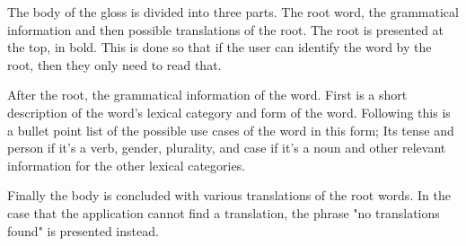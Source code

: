 The body of the gloss is divided into three parts. The root word, the grammatical information and then possible translations of the root. The root is presented at the top, in bold. This is done so that if the user can identify the word by the root, then they only need to read that. 

After the root, the grammatical information of the word. First is a short description of the word's lexical category and form of the word. Following this is a bullet point list of the possible use cases of the word in this form; Its tense and person if it's a verb, gender, plurality, and case if it's a noun and other relevant information for the other lexical categories. 

Finally the body is concluded with various translations of the root words. In the case that the application cannot find a translation, the phrase "no translations found" is presented instead. 
 